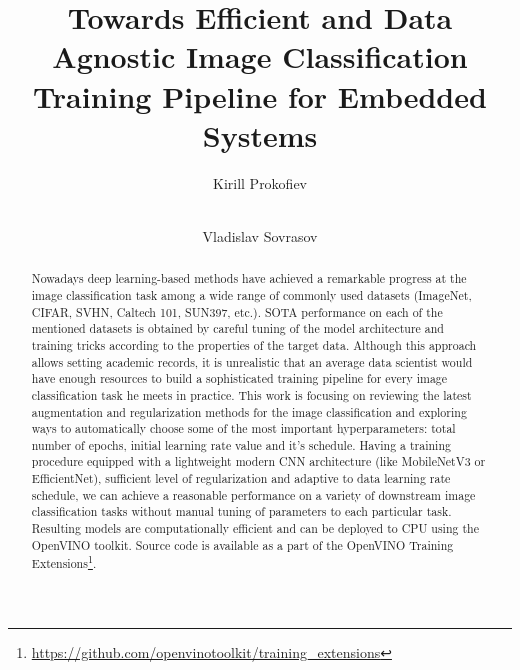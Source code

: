 \documentclass[runningheads]{llncs}
\begin{document}
%
\title{Towards Efficient and Data Agnostic Image Classification Training Pipeline for Embedded Systems}
%
%
\author{Kirill Prokofiev \and \\
Vladislav Sovrasov}
%
%
%
\maketitle              %
%
\begin{abstract}
  Nowadays deep learning-based methods have achieved a remarkable progress at the
  image classification task among a wide range of commonly used datasets (ImageNet, CIFAR,
  SVHN, Caltech 101, SUN397, etc.). SOTA performance on each of the mentioned datasets
  is obtained by careful tuning of the model architecture and training tricks according to
  the properties of the target data. Although this approach allows setting academic records,
  it is unrealistic that an average data scientist would have enough resources to build a sophisticated training pipeline
  for every image classification task he meets in practice. This work is focusing on reviewing
  the latest augmentation and regularization methods for the image classification and
  exploring ways to automatically choose some of the most important hyperparameters:
  total number of epochs, initial learning rate value and it's schedule.
  Having a training procedure equipped with a lightweight modern CNN architecture (like MobileNetV3 or EfficientNet),
  sufficient level of regularization and adaptive to data learning rate schedule,
  we can achieve a reasonable performance on a variety of downstream image classification
  tasks without manual tuning of parameters to each particular task.
  Resulting models are computationally efficient and can be deployed to CPU using the OpenVINO{\texttrademark} toolkit.
  Source code is available as a part of the OpenVINO{\texttrademark} Training
  Extensions\footnote{\url{https://github.com/openvinotoolkit/training_extensions}}.

\end{abstract}
%
%
%
\end{document}
